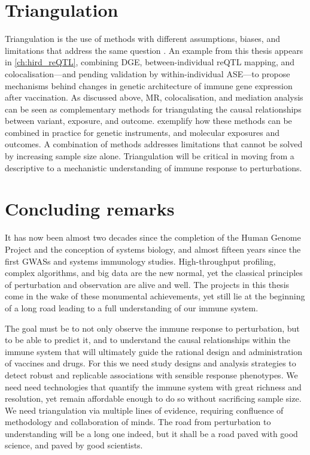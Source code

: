 \section{Triangulation}

Triangulation is the use of methods with different assumptions, biases, and limitations that address the same question \autocite{munafo2018RobustResearchNeeds}.
An example from this thesis appears in \cref{ch:hird_reQTL}, 
combining \gls{DGE}, between-individual \gls{reQTL} mapping, and colocalisation---and pending validation by within-individual \gls{ASE}---to propose mechanisms behind changes in genetic architecture of immune gene expression after vaccination.
As discussed above, \gls{MR}, colocalisation, and mediation analysis can be seen as complementary methods for triangulating the causal relationships between variant, exposure, and outcome.
\textcite{taylor2019IntegrativeAnalysisGene,zheng2019PhenomewideMendelianRandomization} exemplify how these methods can be combined in practice for genetic instruments, and molecular exposures and outcomes.
%
%
A combination of methods addresses limitations that cannot be solved by increasing sample size alone.
Triangulation will be critical in moving from a descriptive to a mechanistic understanding of immune response to perturbations.

\section{Concluding remarks}

It has now been almost two decades since the completion of the Human Genome Project and the conception of systems biology,
and almost fifteen years since the first \glspl{GWAS} and systems immunology studies.
High-throughput profiling, complex algorithms, and big data are the new normal,
yet the classical principles of perturbation and observation are alive and well.
The projects in this thesis come in the wake of these monumental achievements,
yet still lie at the beginning of a long road leading to a full understanding of our immune system.

The goal must be to not only observe the immune response to perturbation,
but to be able to predict it,
and to understand the causal relationships within the immune system that will ultimately guide the rational design and administration of vaccines and drugs.
For this we need study designs and analysis strategies to detect robust and replicable associations with sensible response phenotypes.
We need need technologies that quantify the immune system with great richness and resolution, yet remain affordable enough to do so without sacrificing sample size.
We need triangulation via multiple lines of evidence, 
requiring confluence of methodology and collaboration of minds.
The road from perturbation to understanding will be a long one indeed,
but it shall be a road paved with good science,
and paved by good scientists.

